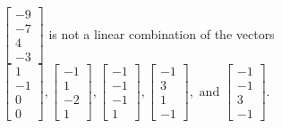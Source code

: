 \begin{exercise}
\begin{exerciseStatement}
  \end{exerciseStatement}
  \begin{exerciseAnswer}
   \(\left[\begin{array}{c}
-9 \\
-7 \\
4 \\
-3
\end{array}\right]\) 
  	 is not  
	a linear combination of the vectors \(\left[\begin{array}{c}
1 \\
-1 \\
0 \\
0
\end{array}\right] , \left[\begin{array}{c}
-1 \\
1 \\
-2 \\
1
\end{array}\right] , \left[\begin{array}{c}
-1 \\
-1 \\
-1 \\
1
\end{array}\right] , \left[\begin{array}{c}
-1 \\
3 \\
1 \\
-1
\end{array}\right] , \text{ and } \left[\begin{array}{c}
-1 \\
-1 \\
3 \\
-1
\end{array}\right]\).

	
  


  \end{exerciseAnswer}
\end{exercise}